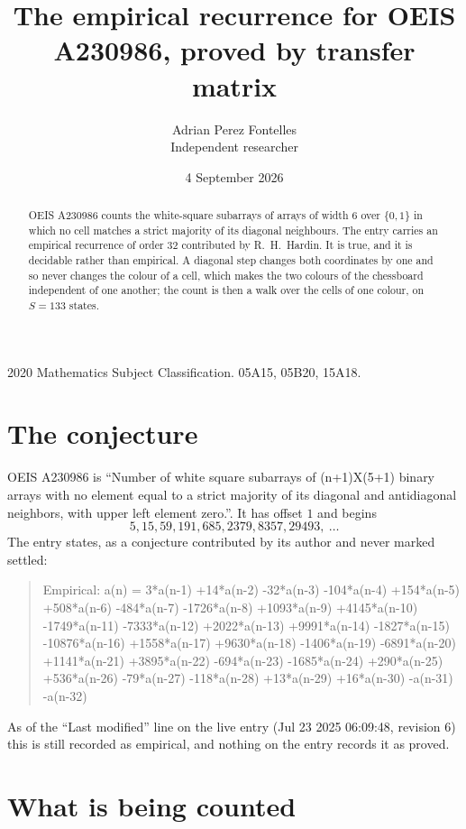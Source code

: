 \documentclass[11pt,a4paper]{article}
\title{The empirical recurrence for OEIS A230986, proved by transfer matrix}
\author{Adrian Perez Fontelles\\ \small Independent researcher}
\date{4 September 2026}
\theoremstyle{plain}
\theoremstyle{definition}
\begin{document}
\maketitle

\begin{abstract}
OEIS A230986 counts the white-square subarrays of arrays of width $6$ over $\{0,1\}$ in which
no cell matches a strict majority of its diagonal neighbours. The entry carries an empirical recurrence of order $32$ contributed by
R.~H.~Hardin. It is true, and it is decidable rather than empirical. A diagonal step changes
both coordinates by one and so never changes the colour of a cell, which makes the two colours
of the chessboard independent of one another; the count is then a walk over the cells of one
colour, on $S=133$ states.
\end{abstract}

\noindent\small 2020 Mathematics Subject Classification. 05A15, 05B20, 15A18.\normalsize

\section{The conjecture}

OEIS A230986 is ``Number of white square subarrays of (n+1)X(5+1) binary arrays with no element equal to a strict majority of its diagonal and antidiagonal neighbors, with upper left element zero.''. It has offset $1$ and begins
\[
5, 15, 59, 191, 685, 2379, 8357, 29493,\ \dots
\]
The entry states, as a conjecture contributed by its author and never marked settled:
\begin{quote}
Empirical: a(n) = 3*a(n-1) +14*a(n-2) -32*a(n-3) -104*a(n-4) +154*a(n-5) +508*a(n-6) -484*a(n-7) -1726*a(n-8) +1093*a(n-9) +4145*a(n-10) -1749*a(n-11) -7333*a(n-12) +2022*a(n-13) +9991*a(n-14) -1827*a(n-15) -10876*a(n-16) +1558*a(n-17) +9630*a(n-18) -1406*a(n-19) -6891*a(n-20) +1141*a(n-21) +3895*a(n-22) -694*a(n-23) -1685*a(n-24) +290*a(n-25) +536*a(n-26) -79*a(n-27) -118*a(n-28) +13*a(n-29) +16*a(n-30) -a(n-31) -a(n-32)
\end{quote}
As of the ``Last modified'' line on the live entry (Jul 23 2025 06:09:48, revision 6) this is still
recorded as empirical, and nothing on the entry records it as proved.

\section{What is being counted}
\end{document}
